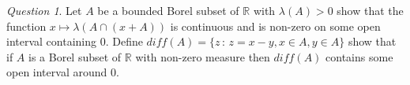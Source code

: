 \documentclass[11pt]{article}
\theoremstyle{definition}
\theoremstyle{remark}
\newtheorem{q}{Question}
\newenvironment{ans}{\paragraph{Answer:}}{\hfill$\square$\vspace{10pt}}
\begin{document}
\begin{q}
Let $A$ be a bounded Borel subset of $\mathbb{R}$ with $\lambda(A)>0$ show that the function $x \mapsto \lambda(A \cap (x+A))$ is continuous and is non-zero on some open interval containing 0. Define $diff(A) = \{ z\,:\, z=x-y, x \in A, y \in A \}$ show that if $A$ is a Borel subset of $\mathbb{R}$ with non-zero measure then $diff(A)$ contains some open interval around 0.
\end{q}
\end{document}

